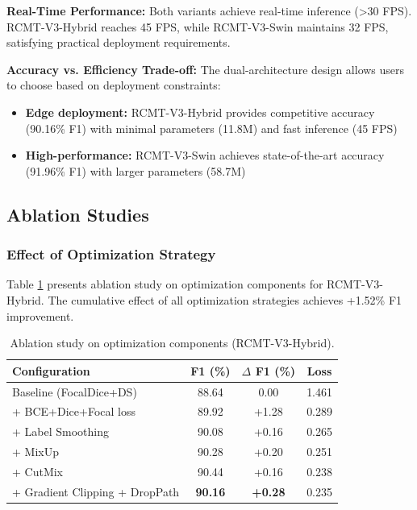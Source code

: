 \documentclass[journal]{IEEEtran}
\begin{document}
{\textbf{Real-Time Performance:} Both variants achieve real-time inference (>30 FPS). RCMT-V3-Hybrid reaches 45 FPS, while RCMT-V3-Swin maintains 32 FPS, satisfying practical deployment requirements.

\textbf{Accuracy vs. Efficiency Trade-off:} The dual-architecture design allows users to choose based on deployment constraints:
\begin{itemize}
\item \textbf{Edge deployment:} RCMT-V3-Hybrid provides competitive accuracy (90.16\% F1) with minimal parameters (11.8M) and fast inference (45 FPS)
\item \textbf{High-performance:} RCMT-V3-Swin achieves state-of-the-art accuracy (91.96\% F1) with larger parameters (58.7M)
\end{itemize}

\subsection{Ablation Studies}

\subsubsection{Effect of Optimization Strategy}

Table \ref{tab:opt_hybrid} presents ablation study on optimization components for RCMT-V3-Hybrid. The cumulative effect of all optimization strategies achieves +1.52\% F1 improvement.

\begin{table}[ht]
\centering
\caption{Ablation study on optimization components (RCMT-V3-Hybrid).}
\label{tab:opt_hybrid}
\begin{tabular}{lccc}
\toprule
\textbf{Configuration} & \textbf{F1 (\%)} & \textbf{$\Delta$ F1 (\%)} & \textbf{Loss} \\
\midrule
    Baseline (FocalDice+DS) & 88.64 & 0.00 & 1.461 \\
    + BCE+Dice+Focal loss & 89.92 & +1.28 & 0.289 \\
    + Label Smoothing & 90.08 & +0.16 & 0.265 \\
    + MixUp & 90.28 & +0.20 & 0.251 \\
    + CutMix & 90.44 & +0.16 & 0.238 \\
    + Gradient Clipping + DropPath & \textbf{90.16} & \textbf{+0.28} & 0.235 \\
\bottomrule
\end{tabular}
\end{table}

}
\end{document}
